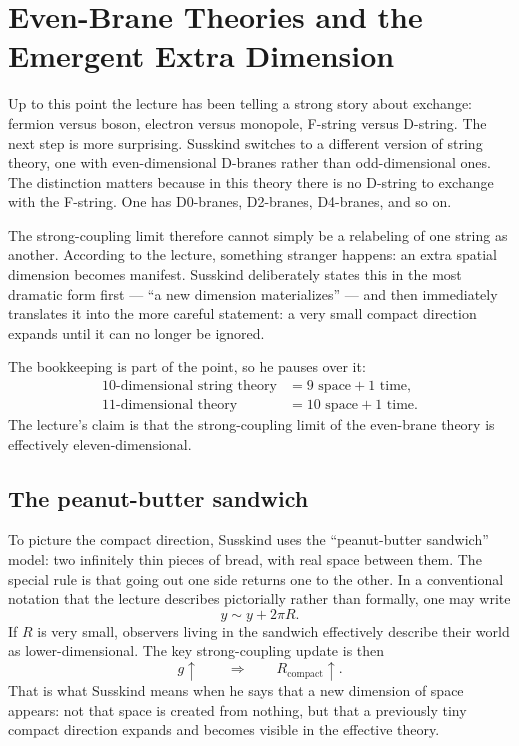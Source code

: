 \section{Even-Brane Theories and the Emergent Extra Dimension}

Up to this point the lecture has been telling a strong story about exchange: fermion versus boson, electron versus monopole, F-string versus D-string. The next step is more surprising. Susskind switches to a different version of string theory, one with even-dimensional D-branes rather than odd-dimensional ones. The distinction matters because in this theory there is no D-string to exchange with the F-string. One has D0-branes, D2-branes, D4-branes, and so on.

The strong-coupling limit therefore cannot simply be a relabeling of one string as another. According to the lecture, something stranger happens: an extra spatial dimension becomes manifest. Susskind deliberately states this in the most dramatic form first --- ``a new dimension materializes'' --- and then immediately translates it into the more careful statement: a very small compact direction expands until it can no longer be ignored.

The bookkeeping is part of the point, so he pauses over it:
\begin{equation}
\begin{aligned}
10\text{-dimensional string theory} &= 9\text{ space}+1\text{ time},\\
11\text{-dimensional theory} &= 10\text{ space}+1\text{ time}.
\end{aligned}
\end{equation}
The lecture's claim is that the strong-coupling limit of the even-brane theory is effectively eleven-dimensional.

\subsection{The peanut-butter sandwich}

To picture the compact direction, Susskind uses the ``peanut-butter sandwich'' model: two infinitely thin pieces of bread, with real space between them. The special rule is that going out one side returns one to the other. In a conventional notation that the lecture describes pictorially rather than formally, one may write
\begin{equation}
y \sim y + 2\pi R.
\end{equation}
If \(R\) is very small, observers living in the sandwich effectively describe their world as lower-dimensional. The key strong-coupling update is then
\begin{equation}
g\uparrow
\qquad \Longrightarrow \qquad
R_{\mathrm{compact}}\uparrow.
\end{equation}
That is what Susskind means when he says that a new dimension of space appears: not that space is created from nothing, but that a previously tiny compact direction expands and becomes visible in the effective theory.


